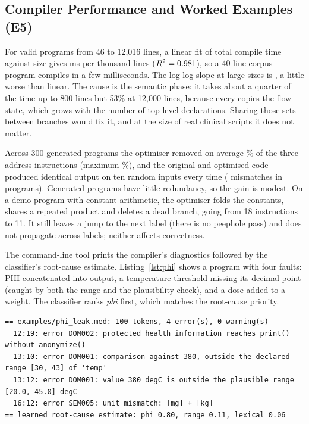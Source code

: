 \subsection{Compiler Performance and Worked Examples (E5)}

For valid programs from 46 to 12{,}016 lines, a linear fit of total compile time against size gives \MsPerKloc{} ms per
thousand lines ($R^2=0.981$), so a 40-line corpus program compiles in a few milliseconds. The log-log slope at large
sizes is \ScaleSlope, a little worse than linear. The cause is the semantic phase: it takes about a quarter of the time up
to 800 lines but 53\% at 12{,}000 lines, because every  copies the flow state, which grows with the number of
top-level declarations. Sharing those sets between branches would fix it, and at the size of real clinical scripts it
does not matter.

Across 300 generated programs the optimiser removed on average \OptMean\% of the three-address instructions (maximum
\OptMax\%), and the original and optimised code produced identical output on ten random inputs every time
(\OptMismatch{} mismatches in \OptPrograms{} programs). Generated programs have little redundancy, so the gain is modest.
On a demo program with constant arithmetic, the optimiser folds the constants, shares a repeated product
 and deletes a dead branch, going from 18 instructions to 11. It still leaves a jump to the next
label (there is no peephole pass) and does not propagate across labels; neither affects correctness.

The command-line tool prints the compiler's diagnostics followed by the classifier's root-cause estimate.
Listing~\ref{lst:phi} shows a program with four faults: PHI concatenated into output, a temperature threshold missing
its decimal point (caught by both the range and the plausibility check), and a dose added to a weight. The classifier
ranks \emph{phi} first, which matches the root-cause priority.

\begin{lstlisting}[language={},numbers=none,basicstyle=\ttfamily\scriptsize,caption={Output of \texttt{medcheck.py examples/phi\_leak.med}.},label={lst:phi}]
== examples/phi_leak.med: 100 tokens, 4 error(s), 0 warning(s)
  12:19: error DOM002: protected health information reaches print() without anonymize()
  13:10: error DOM001: comparison against 380, outside the declared range [30, 43] of 'temp'
  13:12: error DOM001: value 380 degC is outside the plausible range [20.0, 45.0] degC
  16:12: error SEM005: unit mismatch: [mg] + [kg]
== learned root-cause estimate: phi 0.80, range 0.11, lexical 0.06
\end{lstlisting}

